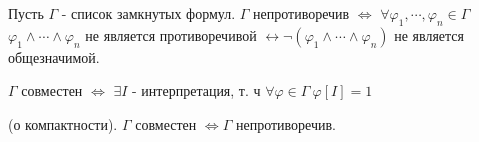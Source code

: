 \begin{conj}
    Пусть $\Gamma$ - список замкнутых формул. $\Gamma$ непротиворечив $\Leftrightarrow$ 
    $\forall \varphi_1, \cdots, \varphi_n \in \Gamma$ $\varphi_1 \land \cdots \land \varphi_n$ не является противоречивой 
    $\leftrightarrow \neg(\varphi_1 \land \cdots \land \varphi_n)$ не является общезначимой.
\end{conj}

\begin{conj}
    $\Gamma$ совместен $\Leftrightarrow$ $\exists I$ - интерпретация, т. ч $\forall \varphi \in \Gamma\ \varphi[I] = 1$
\end{conj}

\begin{theorem}
    (о компактности). $\Gamma$ совместен $\Leftrightarrow \Gamma$ непротиворечив.
\end{theorem}

